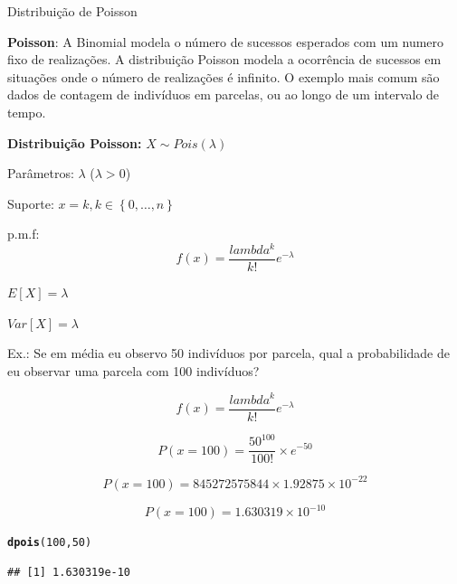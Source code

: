\documentclass{beamer}\usepackage[]{graphicx}\usepackage[]{color}
\makeatletter
\newcommand{\hlnum}[1]{\textcolor[rgb]{0.686,0.059,0.569}{#1}}%
\newcommand{\hlstd}[1]{\textcolor[rgb]{0.345,0.345,0.345}{#1}}%
\newcommand{\hlkwd}[1]{\textcolor[rgb]{0.737,0.353,0.396}{\textbf{#1}}}%
\newenvironment{kframe}{%
 \def\at@end@of@kframe{}%
 \ifinner\ifhmode%
  \def\at@end@of@kframe{\end{minipage}}%
  \begin{minipage}{\columnwidth}%
 \fi\fi%
 \def\FrameCommand##1{\hskip\@totalleftmargin \hskip-\fboxsep
 \colorbox{shadecolor}{##1}\hskip-\fboxsep
     \hskip-\linewidth \hskip-\@totalleftmargin \hskip\columnwidth}%
 \MakeFramed {\advance\hsize-\width
   \@totalleftmargin\z@ \linewidth\hsize
   \@setminipage}}%
 {\par\unskip\endMakeFramed%
 \at@end@of@kframe}
\newenvironment{knitrout}{}{} %
\renewenvironment{knitrout}{\setlength{\topsep}{0mm}}{}
\makeatother
\begin{document}
\begin{frame}{Distribuição de Poisson}

\small{\textbf{Poisson}: A Binomial modela o número de sucessos esperados com um numero fixo de realizações. A distribuição Poisson modela a ocorrência de sucessos em situações onde o número de realizações é infinito. O exemplo mais comum são dados de contagem de indivíduos em parcelas, ou ao longo de um intervalo de tempo}. 

\vfill

\textbf{Distribuição Poisson:} $X \sim Pois(\lambda)$ 
  
Parâmetros: $\lambda$ ($\lambda > 0$)

Suporte: $x = k, k \in \left\{0,\ldots,n\right\}$

p.m.f:
  \begin{equation*}
    f(x) = \frac{lambda^k}{k!} e^{-\lambda}
  \end{equation*}

$E[X] = \lambda$

$Var[X] = \lambda$

\end{frame} 

\begin{frame}[fragile]


Ex.: Se em média eu observo 50 indivíduos por parcela, qual a probabilidade de eu observar uma parcela com 100 indivíduos?

\begin{equation*}
  f(x) = \frac{lambda^k}{k!} e^{-\lambda}
\end{equation*}

\begin{equation*}
  P(x=100) = \frac{50^{100}}{100!} \times e^{-50}
\end{equation*}

\begin{equation*}
  P(x=100) = 845272575844 \times  1.92875 \times 10^{-22}
\end{equation*}

\begin{equation*}
  P(x=100) = 1.630319 \times 10^{-10}
\end{equation*}

\begin{knitrout}\tiny
{}\color{fgcolor}\begin{kframe}
\begin{alltt}
\hlkwd{dpois}\hlstd{(}\hlnum{100}\hlstd{,}\hlnum{50}\hlstd{)}
\end{alltt}
\begin{verbatim}
## [1] 1.630319e-10
\end{verbatim}
\end{kframe}
\end{knitrout}



\end{frame} 
\end{document}
